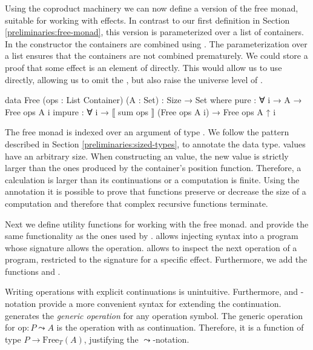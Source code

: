 Using the coproduct machinery we can now define a version of the free monad,
suitable for working with effects.
In contrast to our first definition in Section \ref{preliminaries:free-monad},
this version is parameterized over a list of containers.
In the  constructor the containers are combined
using .
The parameterization over a list ensures that the containers are not combined
prematurely.
We could store a proof that some effect  is an element of
 directly.
This would allow us to use  directly, allowing us to omit the
, but also raise the universe level of .

\begin{code}
data Free (ops : List Container) (A : Set) : {Size} → Set where
  pure    : ∀ {i} → A → Free ops A {i}
  impure  : ∀ {i} → ⟦ sum ops ⟧ (Free ops A {i}) → Free ops A {↑ i}
\end{code}
The free monad is indexed over an argument of type .
We follow the pattern described in Section \ref{preliminaries:sized-types}, to
annotate the data type.
 values have an arbitrary size.
When constructing an  value, the new value is
strictly larger than the ones produced by the container's position function.
Therefore, a calculation is larger than its continuations or a computation is
finite.
Using the annotation it is possible to prove that functions preserve or decrease
the size of a computation and therefore that complex recursive functions
terminate.

Next we define utility functions for working with the free monad.
 and  provide the same functionality as the
ones used by \textcite{DBLP:conf/haskell/WuSH14}.
 allows injecting syntax into a program whose signature allows
the operation.
 allows to inspect the next operation of a
program, restricted to the signature for a specific effect.
Furthermore, we add the functions  and .

Writing operations with explicit continuations is unintuitive.
Furthermore, \AgdaFunction{>>=} and -notation provide a more
convenient syntax for extending the continuation.
 generates the \textit{generic operation} for any operation
symbol.
The generic operation for $\mathrm{op} : P \leadsto A$ is the operation with
 as continuation.
Therefore, it is a function of type $P \rightarrow \mathrm{Free}_T(A)$,
justifying the $\leadsto$-notation.

